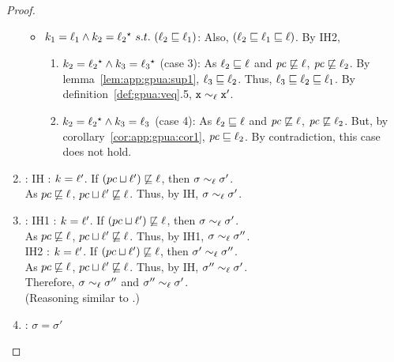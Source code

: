 \begin{proof}
\begin{enumerate}
\begin{itemize}
      \item $k_1 = \ell_1  \wedge k_2 =  
      \ell_2 {}^\star  ~s.t.~ (\ell_2 \sqsubseteq \ell_1)$: Also,
      $(\ell_2 \sqsubseteq \ell_1 \sqsubseteq \ell)$. By
      IH2, 
      \begin{enumerate}
        \item $k_2 =   \ell_2  {}^\star   \wedge k_3 =
        \ell_3  {}^\star  $ (case 3): As $\ell_2 \sqsubseteq
      \ell$ and $\mathit{pc} \not\sqsubseteq \ell$, $\mathit{pc} \not\sqsubseteq
      \ell_2$.  By lemma~\ref{lem:app:gpua:sup1}, $\ell_3 \sqsubseteq \ell_2 $. Thus,
      $\ell_3\sqsubseteq \ell_2 \sqsubseteq \ell_1$. By definition~\ref{def:gpua:veq}.5, $\texttt{x}
         \sim_\ell \texttt{x}'$.
        \item  $k_2 =   \ell_2  {}^\star   \wedge k_3 =
      \ell_3$ (case 4): As $\ell_2 \sqsubseteq
      \ell$ and $\mathit{pc} \not\sqsubseteq \ell$, $\mathit{pc} \not\sqsubseteq
      \ell_2$. But, by corollary~\ref{cor:app:gpua:cor1}, $\mathit{pc} \sqsubseteq \ell_2$. By
      contradiction, this case      does not hold.
     \end{enumerate}
 \end{itemize}
 
\item {} : IH : $k = \ell'$. If $(pc \sqcup \ell')
   \not\sqsubseteq \ell $, then $\sigma \sim_\ell \sigma'$. \\
  As $pc \not\sqsubseteq \ell$, $pc \sqcup \ell' \not\sqsubseteq 
  \ell$. Thus, by IH, $\sigma \sim_\ell \sigma'$. 
 
 \item {}: IH1 : $k = \ell'$. If $(pc \sqcup \ell')
   \not\sqsubseteq \ell $, then $\sigma \sim_\ell \sigma'$. \\
   As $pc \not\sqsubseteq \ell$, $pc \sqcup \ell' \not\sqsubseteq
  \ell$. Thus, by IH1, $\sigma \sim_\ell \sigma''$. \\
   IH2 : $k = \ell'$. If $(pc \sqcup \ell')
   \not\sqsubseteq \ell $, then $\sigma' \sim_\ell \sigma''$. \\
As $pc \not\sqsubseteq \ell$, $pc \sqcup \ell' \not\sqsubseteq
  \ell$. Thus, by IH, $\sigma'' \sim_\ell \sigma'$. \\
  Therefore, $\sigma \sim_\ell \sigma''$ and $\sigma'' \sim_\ell
  \sigma'$. \\ 
 (Reasoning similar to .)
 
\item {} : $\sigma = \sigma'$
\end{enumerate}
\end{proof}

